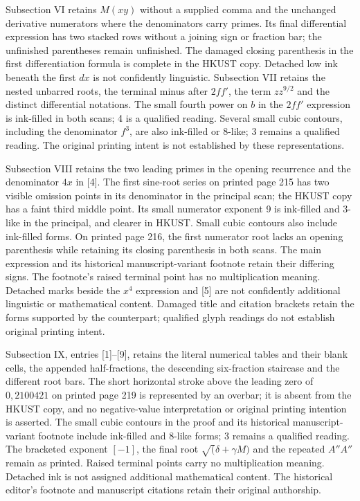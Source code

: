 Subsection VI retains $M(xy)$ without a supplied comma and the unchanged derivative numerators where the denominators carry primes. Its final differential expression has two stacked rows without a joining sign or fraction bar; the unfinished parentheses remain unfinished. The damaged closing parenthesis in the first differentiation formula is complete in the HKUST copy. Detached low ink beneath the first $dx$ is not confidently linguistic. Subsection VII retains the nested unbarred roots, the terminal minus after $2ff'$, the term $zz^{9/2}$ and the distinct differential notations. The small fourth power on $b$ in the $2ff'$ expression is ink-filled in both scans; 4 is a qualified reading. Several small cubic contours, including the denominator $f^3$, are also ink-filled or 8-like; 3 remains a qualified reading. The original printing intent is not established by these representations.


Subsection VIII retains the two leading primes in the opening recurrence and the denominator $4x$ in [4]. The first sine-root series on printed page 215 has two visible omission points in its denominator in the principal scan; the HKUST copy has a faint third middle point. Its small numerator exponent 9 is ink-filled and 3-like in the principal, and clearer in HKUST. Small cubic contours also include ink-filled forms. On printed page 216, the first numerator root lacks an opening parenthesis while retaining its closing parenthesis in both scans. The main expression and its historical manuscript-variant footnote retain their differing signs. The footnote's raised terminal point has no multiplication meaning. Detached marks beside the $x^4$ expression and [5] are not confidently additional linguistic or mathematical content. Damaged title and citation brackets retain the forms supported by the counterpart; qualified glyph readings do not establish original printing intent.


Subsection IX, entries [1]–[9], retains the literal numerical tables and their blank cells, the appended half-fractions, the descending six-fraction staircase and the different root bars. The short horizontal stroke above the leading zero of $0{,}2100421$ on printed page 219 is represented by an overbar; it is absent from the HKUST copy, and no negative-value interpretation or original printing intention is asserted. The small cubic contours in the proof and its historical manuscript-variant footnote include ink-filled and 8-like forms; 3 remains a qualified reading. The bracketed exponent $[-1]$, the final root $\surd(\delta+\gamma M)$ and the repeated $A''A''$ remain as printed. Raised terminal points carry no multiplication meaning. Detached ink is not assigned additional mathematical content. The historical editor's footnote and manuscript citations retain their original authorship.


